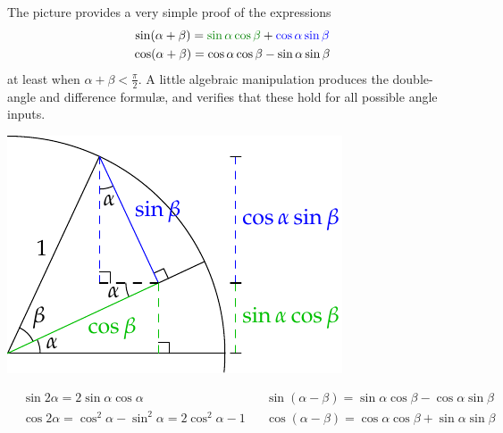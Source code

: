 \begin{minipage}[t]{0.63\linewidth}\vspace{-10pt}
	\label{sec:multangle}
	
	The picture provides a very simple proof of the expressions
	\begin{gather*}
		\sin(\alpha+\beta)=\textcolor{Green}{\sin\alpha\cos\beta}+\textcolor{blue}{\cos\alpha\sin\beta}\\
		\cos(\alpha+\beta)=\cos\alpha\cos\beta-\sin\alpha\sin\beta
	\end{gather*}
	at least when $\alpha+\beta<\frac\pi 2$. A little algebraic manipulation produces the double-angle and difference formulæ, and verifies that these hold for all possible angle inputs.
\end{minipage}
\hfill
\begin{minipage}[t]{0.36\linewidth}\vspace{0pt}
	\flushright\includegraphics[scale=0.85]{angles-multipleangle}
\end{minipage}\par
\begin{align*}
	&\sin 2\alpha=2\sin\alpha\cos\alpha &&\sin(\alpha-\beta)=\sin\alpha\cos\beta-\cos\alpha\sin\beta\\
	&\cos 2\alpha=\cos^2\alpha-\sin^2\alpha=2\cos^2\alpha-1&&\cos(\alpha-\beta)=\cos\alpha\cos\beta+\sin\alpha\sin\beta
\end{align*}

\smallskip

